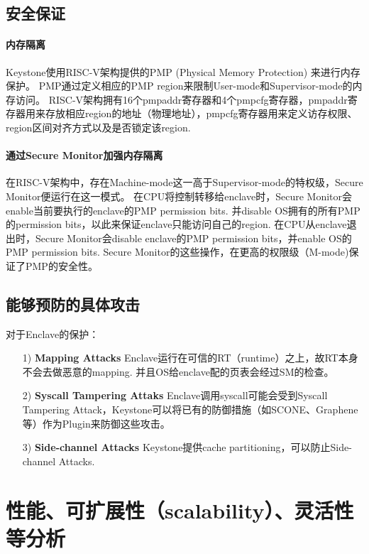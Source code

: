 \subsection{安全保证}
\paragraph{内存隔离}
Keystone使用RISC-V架构提供的PMP (Physical Memory Protection) 来进行内存保护。
PMP通过定义相应的PMP region来限制User-mode和Supervisor-mode的内存访问。
RISC-V架构拥有16个pmpaddr寄存器和4个pmpcfg寄存器，pmpaddr寄存器用来存放相应region的地址（物理地址），pmpcfg寄存器用来定义访存权限、region区间对齐方式以及是否锁定该region.
\paragraph{通过Secure Monitor加强内存隔离}
在RISC-V架构中，存在Machine-mode这一高于Supervisor-mode的特权级，Secure Monitor便运行在这一模式。
在CPU将控制转移给enclave时，Secure Monitor会enable当前要执行的enclave的PMP permission bits. 并disable OS拥有的所有PMP的permission bits，以此来保证enclave只能访问自己的region.
在CPU从enclave退出时，Secure Monitor会disable enclave的PMP permission bits，并enable OS的PMP permission bits.
Secure Monitor的这些操作，在更高的权限级（M-mode)保证了PMP的安全性。

\subsection{能够预防的具体攻击}
对于Enclave的保护：
\begin{itemize}
	\item [1)]
	\textbf{Mapping Attacks} Enclave运行在可信的RT（runtime）之上，故RT本身不会去做恶意的mapping. 并且OS给enclave配的页表会经过SM的检查。
	\item [2)]
	\textbf{Syscall Tampering Attaks} Enclave调用syscall可能会受到Syscall Tampering Attack，Keystone可以将已有的防御措施（如SCONE、Graphene等）作为Plugin来防御这些攻击。
	\item [3)]
	\textbf{Side-channel Attacks} Keystone提供cache partitioning，可以防止Side-channel Attacks.
\end{itemize}

\section{性能、可扩展性（scalability）、灵活性等分析}
